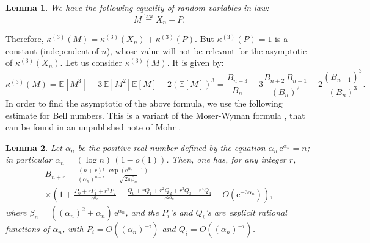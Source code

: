 \documentclass[12pt,a4paper,reqno]{amsart}
\newtheorem{lemma}{Lemma}[section]
\theoremstyle{remark}
\newcommand{\E}{\mathrm{e}}
\newcommand{\esper}{\mathbb{E}}
\begin{document}
\begin{lemma}
    \cite[Theorem 2]{StamRandomPartition}
    We have the following equality of random variables in law:
    \[M \stackrel{\text{law}}{=} X_n + P.\] 
\end{lemma}

\noindent Therefore, $\kappa^{(3)}(M) = \kappa^{(3)}(X_n) + \kappa^{(3)}(P)$. But $\kappa^{(3)}(P)=1$ is a constant (independent of $n$), whose value will not be relevant for the asymptotic of $\kappa^{(3)}(X_n)$. Let us consider $\kappa^{(3)}(M)$. It is given by:
\[\kappa^{(3)}(M) = \esper[M^3] -3 \,\esper[M^2] \esper[M] +2 (\esper[M])^3=\frac{B_{n+3}}{B_n} -3 \frac{B_{n+2}\, B_{n+1}}{(B_n)^2}
+2 \frac{(B_{n+1})^3}{(B_n)^3}.\]
In order to find the asymptotic of the above formula, we use the following estimate for Bell numbers. This is a variant of the Moser-Wyman formula \cite{MoserWymanFormula}, that can be found in an unpublished note of Mohr \cite{NoteMohr}.

\begin{lemma}
Let $\alpha_n$ be the positive real number defined by the equation $\alpha_n\, \E^{\alpha_n}=n$; in particular $\alpha_n=(\log n)\,(1-o(1))$. Then, one has, for any integer $r$,
    \begin{multline*}
        B_{n+r}=\frac{(n+r)!}{(\alpha_n)^{n+r}}\, \frac{\exp(\E^{\alpha_n}-1)}{\sqrt{2\pi \beta_n}} \\
        \times \left( 1+\frac{P_0+rP_1+r^2P_2}{\E^{\alpha_n}}+\frac{Q_0+rQ_1+r^2Q_2+r^3Q_3+r^4Q_4}{\E^{2\alpha_n}} +O(\E^{-3\alpha_n}) \right),
    \end{multline*}
where $\beta_n=((\alpha_n)^2+\alpha_n)\,\E^{\alpha_n}$, and the $P_i$'s and $Q_i$'s are explicit rational functions of $\alpha_n$, with $P_i=O((\alpha_n)^{-i})$ and $Q_i=O((\alpha_n)^{-i})$.
\end{lemma}
\end{document}
